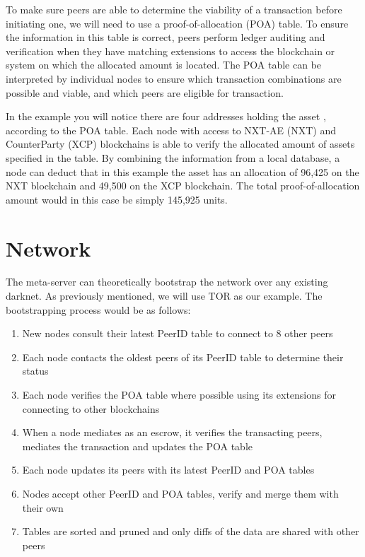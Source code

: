 \documentclass[a4paper]{article}
\begin{document}
To make sure peers are able to determine the viability of a transaction before initiating one, we will need to use a proof-of-allocation (POA) table. To ensure the information in this table is correct, peers perform ledger auditing and verification when they have matching extensions to access the blockchain or system on which the allocated amount is located. The POA table can be interpreted by individual nodes to ensure which transaction combinations are possible and viable, and which peers are eligible for transaction.

In the example you will notice there are four addresses holding the asset \stormwind, according to the POA table. Each node with access to NXT-AE (NXT) and CounterParty (XCP) blockchains is able to verify the allocated amount of assets specified in the table. By combining the information from a local database, a node can deduct that in this example the asset \stormwind has an allocation of 96,425 on the NXT blockchain and 49,500 on the XCP blockchain. The total proof-of-allocation amount would in this case be simply 145,925 units.

\section{Network}

The meta-server can theoretically bootstrap the network over any existing darknet. As previously mentioned, we will use TOR as our example. The bootstrapping process would be as follows:

\begin{enumerate}
\item New nodes consult their latest PeerID table to connect to 8 other peers
\item Each node contacts the oldest peers of its PeerID table to determine their status
\item Each node verifies the POA table where possible using its extensions
	    for connecting to other blockchains
\item When a node mediates as an escrow, it verifies the transacting peers,
	    mediates the transaction and updates the POA table
\item Each node updates its peers with its latest PeerID and POA tables
\item Nodes accept other PeerID and POA tables, verify and merge them with their own
\item Tables are sorted and pruned and only diffs of the data are shared with other peers
\end{enumerate}
\end{document}

